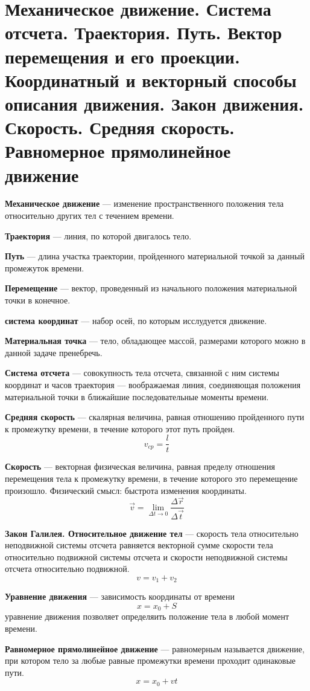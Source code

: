 \documentclass{report}
\begin{document}
\renewcommand{\partname}{Билет}
\part{Механическое движение. 
Система отсчета. 
Траектория. Путь. 
Вектор перемещения и его проекции. 
Координатный и векторный способы описания движения. 
Закон движения. 
Скорость. 
Средняя скорость. 
Равномерное прямолинейное движение}

{\bf Механическое движение} —
изменение пространственного положения тела относительно других тел с течением времени. 

{\bf Траектория} —
линия, по которой двигалось тело.

{\bf Путь} —
длина участка траектории, пройденного материальной точкой за данный промежуток времени.

{\bf Перемещение} —
вектор, проведенный из начального положения материальной точки в конечное. 

{\bf система координат} —
набор осей, по которым исслудуется движение.

{\bf Материальная точка} —
тело, обладающее массой, размерами которого можно в данной задаче пренебречь.

{\bf Система отсчета} —
совокупность тела отсчета, связанной с ним системы координат и часов траектория — воображаемая линия, соединяющая положения материальной точки в ближайшие последовательные моменты времени.

{\bf Средняя скорость} —
скалярная величина, равная отношению пройденного пути к промежутку времени, в течение которого этот путь пройден. 
$$
v_{cp}=\frac{l}{t}
$$

{\bf Скорость} —
векторная физическая величина, равная пределу отношения перемещения тела к промежутку времени, в течение которого это перемещение произошло.
Физический смысл: быстрота изменения координаты.
$$
\overrightarrow{v}=\lim_{\Delta t\rightarrow 0}\frac{\Delta \overrightarrow{r}}{\Delta \overrightarrow{t}}
$$

{\bf Закон Галилея. Относительное движение тел} —
скорость тела относительно неподвижной системы отсчета равняется векторной сумме скорости тела относительно подвижной системы отсчета и скорости неподвижной системы отсчета относительно подвижной.
$$
v=v_1+v_2
$$

{\bf Уравнение движения} —
зависимость координаты от времени
$$
x=x_0+S
$$
уравнение движения позволяет определяить положение тела в любой момент времени.

{\bf Равномерное прямолинейное движение} —
равномерным называется движение, при котором тело за любые равные промежутки времени проходит одинаковые пути.
$$
x=x_0+vt
$$
\end{document}
